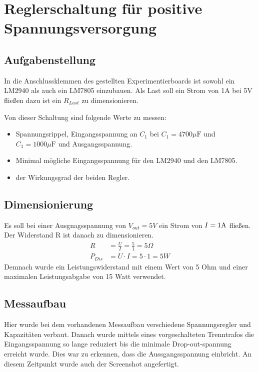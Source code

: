 \section{Reglerschaltung für positive Spannungsversorgung}
\subsection{Aufgabenstellung}
In die Anschlussklemmen des gestellten Experimentierboards ist sowohl ein LM2940 als auch ein LM7805 einzubauen. Als Last soll ein Strom von 1A bei 5V fließen dazu ist ein $R_{Last}$ zu dimensionieren. 

Von dieser Schaltung sind folgende Werte zu messen:
\begin{itemize}
    \item Spannungsrippel, Eingangsspannung an $C_1$ bei $C_1=4700\mu \text{F}$ und $C_1=1000\mu \text{F}$ und Ausgangsspannung.
    \item Minimal mögliche Eingangsspannung für den LM2940 und den LM7805.
    \item der Wirkungsgrad der beiden Regler.
\end{itemize}
\subsection{Dimensionierung}
Es soll bei einer Ausgnagsspannung von $V_{out} = 5V$ ein Strom von $I=1\rm A$ fließen. Der Widerstand R ist danach zu dimensionieren.
\begin{align}
    R&= \frac{U}{I} = \frac{5}{1} = 5\Omega \\
    P_{Dis} &= U \cdot I = 5\cdot 1 = 5 W
\end{align}
Demnach wurde ein Leistungswiderstand mit einem Wert von 5 Ohm und einer maximalen Leistungsabgabe von 15 Watt verwendet.
\subsection{Messaufbau}
Hier wurde bei dem vorhandenen Messaufbau verschiedene Spannungsregler und Kapazitäten verbaut. Danach wurde mittels eines vorgeschalteten Trenntrafos die Eingangsspannung so lange reduziert bis die minimale Drop-out-spannung erreicht wurde. Dies war zu erkennen, dass die Aussgangsspannung einbricht. An diesem Zeitpunkt wurde auch der Screenshot angefertigt. 

